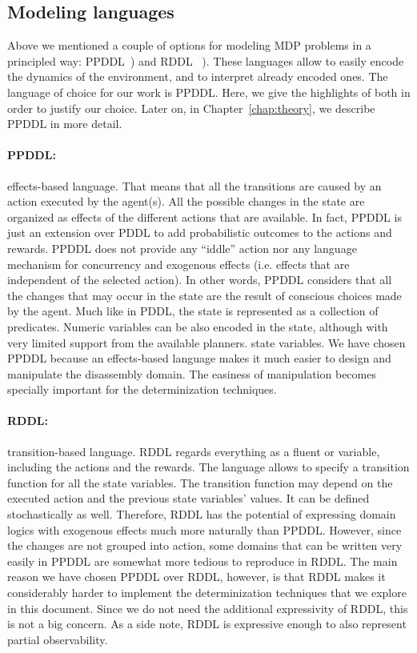 \documentclass[../root.tex]{subfiles}
\begin{document}
\subsection{Modeling languages}
\label{sec:modeling-languages}

Above we mentioned a couple of options for modeling MDP
problems in a principled way: PPDDL~\cite{younes2004ppddl1}) and RDDL%
~\cite{sanner2010relational}). These languages allow to easily encode
the dynamics of the environment, and to interpret already encoded
ones. The language of choice for
our work is PPDDL. Here, we give the highlights of both in order
to justify our choice.
Later on, in Chapter~\ref{chap:theory}, we describe PPDDL in more detail.

\paragraph{PPDDL:} effects-based language. That means that
all the transitions are caused by an action executed by the agent(s). All
the possible changes in the state are organized as effects
of the different actions that are available. In fact, PPDDL is just an extension
over PDDL to add probabilistic outcomes to the actions and rewards. PPDDL does not provide any ``iddle'' action nor any language mechanism
for concurrency and exogenous effects (i.e.
effects that are independent of the selected action).
In other words, PPDDL considers that all the changes that may occur in the
state are the result of conscious choices made by the agent.
Much like in PDDL, the state is represented as a collection
of predicates. Numeric variables can be also encoded in the state, although with
very limited support from the available planners.
state variables. We have chosen PPDDL because an effects-based language
makes it much easier to design and
manipulate the disassembly domain.
The easiness of manipulation becomes specially important for
the determinization techniques.

\paragraph{RDDL:} transition-based language. RDDL regards everything as a
fluent or variable, including the actions and the rewards. The language allows
to specify a transition function for all the state variables. The transition
function may depend on the executed action and the previous state variables'
values. It can be defined stochastically as well. Therefore, RDDL has
the potential of expressing domain logics
with exogenous effects much more naturally than PPDDL. However, since the
changes are not grouped into action, some domains that can be written very
easily in PPDDL are somewhat more tedious to reproduce in RDDL. The main
reason we have chosen PPDDL over RDDL, however, is that RDDL makes it
considerably harder to implement the determinization techniques that we
explore in this document. Since we do not need the additional expressivity
of RDDL, this is not a big concern. As a side note, RDDL is expressive
enough to also represent partial observability.
\end{document}
